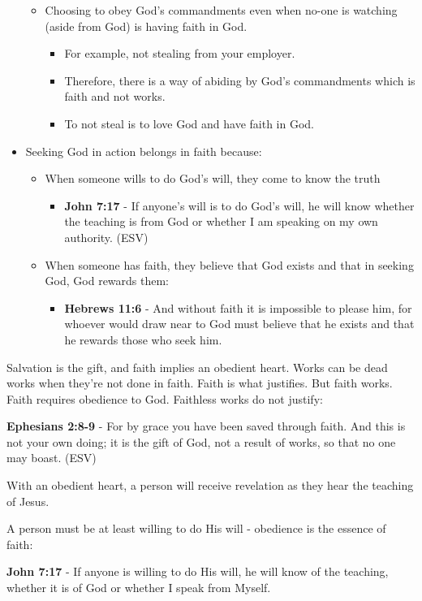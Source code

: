 \documentclass[11pt]{article}
\begin{document}
\begin{itemize}
\begin{itemize}
\item Choosing to obey God's commandments even when no-one is watching (aside from God) is having faith in God.
\begin{itemize}
\item For example, not stealing from your employer.
\item Therefore, there is a way of abiding by God's commandments which is faith and not works.
\item To not steal is to love God and have faith in God.
\end{itemize}
\end{itemize}
\item Seeking God in action belongs in faith because:
\begin{itemize}
\item When someone wills to do God's will, they come to know the truth
\begin{itemize}
\item \textbf{John 7:17} - If anyone's will is to do God's will, he will know whether the teaching is from God or whether I am speaking on my own authority. (ESV)
\end{itemize}
\item When someone has faith, they believe that God exists and that in seeking God, God rewards them:
\begin{itemize}
\item \textbf{Hebrews 11:6} - And without faith it is impossible to please him, for whoever would draw near to God must believe that he exists and that he rewards those who seek him.
\end{itemize}
\end{itemize}
\end{itemize}

Salvation is the gift, and faith implies an obedient heart. Works can be dead works when they're not done in faith. Faith is what justifies. But faith works. Faith requires obedience to God. Faithless works do not justify:

\textbf{Ephesians 2:8-9} - For by grace you have been saved through faith. And this is not your own doing; it is the gift of God, not a result of works, so that no one may boast. (ESV)

With an obedient heart, a person will receive revelation as they hear the teaching of Jesus.

A person must be at least willing to do His will - obedience is the essence of faith:

\textbf{John 7:17} - If anyone is willing to do His will, he will know of the teaching, whether it is of God or whether I speak from Myself.
\end{document}
